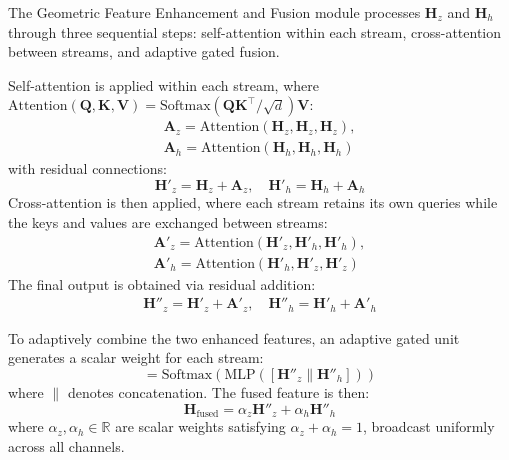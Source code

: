 \documentclass[a4paper,fleqn]{cas-sc}
\begin{document}
The Geometric Feature Enhancement and Fusion module processes $\mathbf{H}_z$ and $\mathbf{H}_h$ through three sequential steps: self-attention within each stream, cross-attention between streams, and adaptive gated fusion.

Self-attention is applied within each stream, where $\text{Attention}(\mathbf{Q}, \mathbf{K}, \mathbf{V}) = \text{Softmax}(\mathbf{Q}\mathbf{K}^\top / \sqrt{d})\mathbf{V}$:
\begin{equation}
	\begin{aligned}
		\mathbf{A}_z = \text{Attention}(\mathbf{H}_z, \mathbf{H}_z, \mathbf{H}_z), \\
		\mathbf{A}_h = \text{Attention}(\mathbf{H}_h, \mathbf{H}_h, \mathbf{H}_h)
	\end{aligned}
\end{equation}
with residual connections:
\begin{equation}
	\mathbf{H}'_z = \mathbf{H}_z + \mathbf{A}_z, \quad \mathbf{H}'_h = \mathbf{H}_h + \mathbf{A}_h
\end{equation}
Cross-attention is then applied, where each stream retains its own queries while the keys and values are exchanged between streams:
\begin{equation}
	\begin{aligned}
		\mathbf{A}'_z = \text{Attention}(\mathbf{H}'_z, \mathbf{H}'_h, \mathbf{H}'_h), \\
		\mathbf{A}'_h = \text{Attention}(\mathbf{H}'_h, \mathbf{H}'_z, \mathbf{H}'_z)
	\end{aligned}
\end{equation}
The final output is obtained via residual addition:
\begin{equation}
	\begin{aligned}
		\mathbf{H}''_z = \mathbf{H}'_z + \mathbf{A}'_z, \quad \mathbf{H}''_h = \mathbf{H}'_h + \mathbf{A}'_h
	\end{aligned}
\end{equation}

To adaptively combine the two enhanced features, an adaptive gated unit generates a scalar weight for each stream:
\begin{equation}
	[\alpha_z, \alpha_h] = \text{Softmax}(\text{MLP}([\mathbf{H}''_z \| \mathbf{H}''_h]))
\end{equation}
where $\|$ denotes concatenation. The fused feature is then:
\begin{equation}
	\mathbf{H}_{\text{fused}} = \alpha_z \mathbf{H}''_z + \alpha_h \mathbf{H}''_h
\end{equation}
where $\alpha_z, \alpha_h \in \mathbb{R}$ are scalar weights satisfying $\alpha_z + \alpha_h = 1$, broadcast uniformly across all channels.
\end{document}
